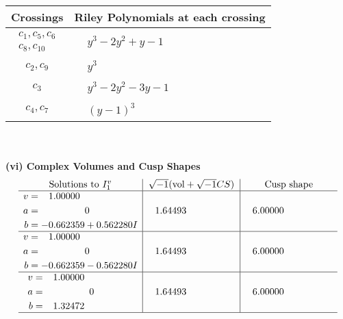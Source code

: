 \documentclass[1p]{elsarticle_modified}
\theoremstyle{definition}
\newcommand{\I}{\sqrt{-1}}
\begin{document}
\begin{tabular}{m{50pt}|m{274pt}}
Crossings & \hspace{64pt}Riley Polynomials at each crossing \\
\hline $$\begin{aligned}c_{1},c_{5},c_{6}\\c_{8},c_{10}\end{aligned}$$&$\begin{aligned}
&y^3-2 y^2+y-1
\end{aligned}$\\
\hline $$\begin{aligned}c_{2},c_{9}\end{aligned}$$&$\begin{aligned}
&y^3
\end{aligned}$\\
\hline $$\begin{aligned}c_{3}\end{aligned}$$&$\begin{aligned}
&y^3-2 y^2-3 y-1
\end{aligned}$\\
\hline $$\begin{aligned}c_{4},c_{7}\end{aligned}$$&$\begin{aligned}
&(y-1)^3
\end{aligned}$\\
\hline
\end{tabular}\\~\\
\newpage\flushleft \textbf{(vi) Complex Volumes and Cusp Shapes}
$$\begin{array}{c|c|c}  
\text{Solutions to }I^v_{1}& \I (\text{vol} + \sqrt{-1}CS) & \text{Cusp shape}\\
 \hline 
\begin{aligned}
v &= \phantom{-}1.00000\phantom{ +0.000000I} \\
a &= \phantom{-0.000000 } 0 \\
b &= -0.662359 + 0.562280 I\end{aligned}
 & \phantom{-}1.64493\phantom{ +0.000000I} & \phantom{-}6.00000\phantom{ +0.000000I} \\ \hline\begin{aligned}
v &= \phantom{-}1.00000\phantom{ +0.000000I} \\
a &= \phantom{-0.000000 } 0 \\
b &= -0.662359 - 0.562280 I\end{aligned}
 & \phantom{-}1.64493\phantom{ +0.000000I} & \phantom{-}6.00000\phantom{ +0.000000I} \\ \hline\begin{aligned}
v &= \phantom{-}1.00000\phantom{ +0.000000I} \\
a &= \phantom{-0.000000 } 0 \\
b &= \phantom{-}1.32472\phantom{ +0.000000I}\end{aligned}
 & \phantom{-}1.64493\phantom{ +0.000000I} & \phantom{-}6.00000\phantom{ +0.000000I}\\
 \hline 
 \end{array}$$\newpage
\end{document}
